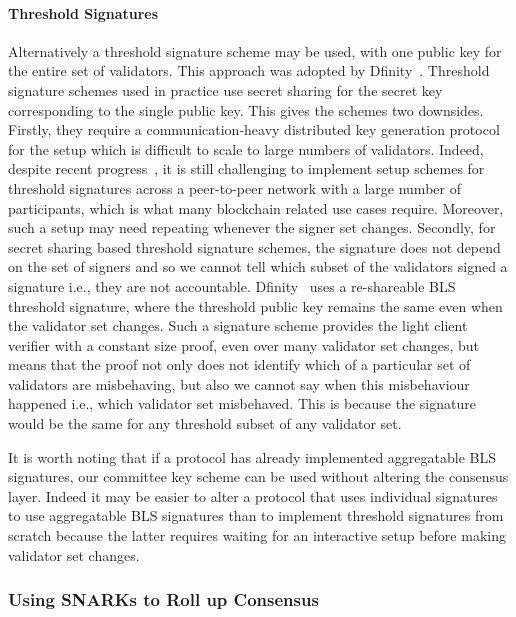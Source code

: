 \noindent \paragraph{Threshold Signatures} Alternatively a threshold signature scheme may be used, with one public key for the entire set of validators. This approach was adopted by Dfinity~\cite{GrothDKG}. Threshold signature schemes used in practice use secret sharing for the secret key corresponding to the single public key. This gives the schemes two downsides. Firstly, they require a communication-heavy distributed key generation protocol for the setup which is difficult to scale to large numbers of validators. Indeed, despite recent progress~\cite{AggregatableDKG,GrothDKG,LWEDKG}, it is still challenging to implement setup schemes for threshold signatures across a peer-to-peer network with a large number of participants, which is what many blockchain related use cases require. Moreover, such a setup may need repeating whenever the signer set changes. Secondly, for secret sharing based threshold signature schemes, the signature does not depend on the set of signers and so we cannot tell which subset of the validators signed a signature i.e., they are not accountable. Dfinity~\cite{GrothDKG} uses a re-shareable BLS threshold signature, where the threshold public key remains the same even when the validator set changes. Such a signature scheme 
provides the light client verifier with a constant size proof, even over many validator set changes, but means that the proof not only does not identify which of a particular set of validators are misbehaving, but also we cannot say when this misbehaviour happened i.e., which validator set misbehaved. This is because the signature would be the same for any threshold subset of any validator set.

\noindent It is worth noting that if a protocol has already implemented aggregatable BLS signatures, our committee key scheme can be used without altering the consensus layer. Indeed it may be easier to alter a protocol that uses individual 
signatures to use aggregatable BLS signatures than to implement threshold signatures from scratch because the latter requires waiting for an interactive setup before making validator set changes.

\subsubsection{Using SNARKs to Roll up Consensus}


